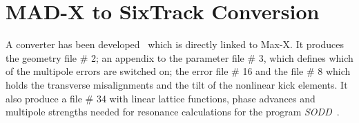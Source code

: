 \section{MAD-X to SixTrack Conversion} \label{MADT}

A converter has been developed~\cite{CONVERTOR} which is directly linked to Max-X\@.
It produces the geometry file \# 2; an appendix to the parameter file \# 3, which defines which of the multipole errors are switched on; the error file \# 16 and the file \# 8 which holds the transverse misalignments and the tilt of the nonlinear kick elements.
It also produce a file \# 34 with linear lattice functions, phase advances and multipole strengths needed for resonance calculations for the program \textit{SODD}~\cite{SODD}.
